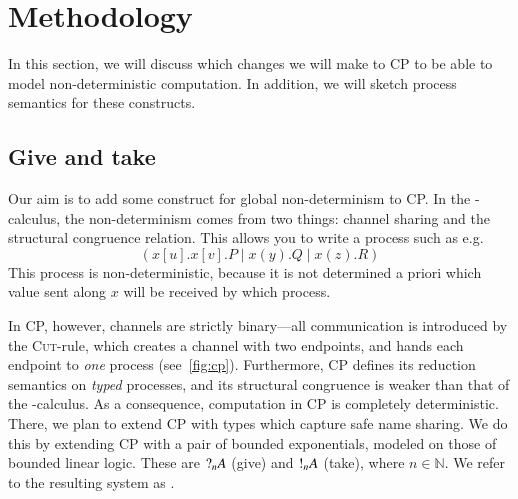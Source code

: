 \documentclass[10pt,a4paper,twocolumn,notitlepage]{article}
\begin{document}
\section{Methodology}
In this section, we will discuss which changes we will make to CP to be able to
model non-deterministic computation. In addition, we will sketch process
semantics for these constructs.

\subsection{Give and take}\label{sec:give-and-take}
Our aim is to add some construct for global non-determinism to CP.
In the \textpi-calculus, the non-determinism comes from two things: channel
sharing and the structural congruence relation.
This allows you to write a process such as e.g.\ %
\[
  (x[u].x[v].P \mid x(y).Q \mid x(z).R)
\]
This process is non-deterministic, because it is not determined a priori which
value sent along $x$ will be received by which process. 

In CP, however, channels are strictly binary---all communication is introduced
by the \textsc{Cut}-rule, which creates a channel with two endpoints, and hands
each endpoint to \emph{one} process (see~\autoref{fig:cp}).
Furthermore, CP defines its reduction semantics on \emph{typed} processes, and
its structural congruence is weaker than that of the \textpi-calculus.
As a consequence, computation in CP is completely deterministic.
There, we plan to extend CP with types which capture safe name sharing.
We do this by extending CP with a pair of bounded exponentials, modeled on those
of bounded linear logic. These are $\give[n]{A}$ (give) and $\take[n]{A}$
(take), where $n \in \mathbb{N}$. 
We refer to the resulting system as \gtcp.
\end{document}
